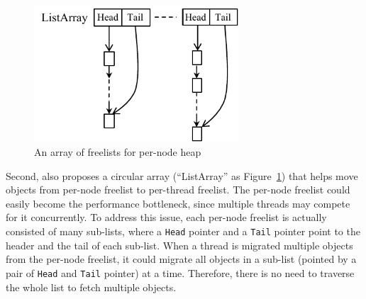 
\begin{figure}[!ht]
\centering
\includegraphics[width=3in]{figure/listarray}
\caption{An array of freelists for per-node heap\label{fig:listarray}}
\end{figure}

Second, \NM{} also proposes a circular array (``ListArray'' as Figure~\ref{fig:listarray}) that helps move objects from per-node freelist to per-thread freelist. The per-node freelist could easily become the performance bottleneck, since multiple threads may compete for it concurrently. To address this issue, each per-node freelist is actually consisted of many sub-lists, where a \texttt{Head} pointer and a \texttt{Tail} pointer point to the header and the tail of each sub-list. When a thread is migrated multiple objects from the per-node freelist, it could migrate all objects in a sub-list (pointed by a pair of \texttt{Head} and \texttt{Tail} pointer) at a time. Therefore, there is no need to traverse the whole list to fetch multiple objects. 

